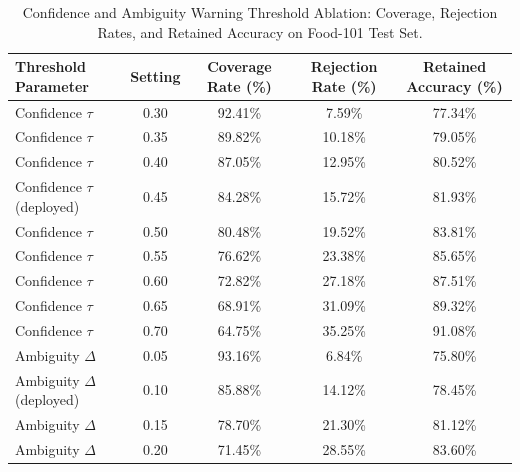 \begin{table}[htbp]
\centering
\caption{Confidence and Ambiguity Warning Threshold Ablation: Coverage, Rejection Rates, and Retained Accuracy on Food-101 Test Set.}
\label{tbl:confidence_ablation}
\small
\begin{tabular}{lcccc}
\toprule
Threshold Parameter & Setting & Coverage Rate (\%) & Rejection Rate (\%) & Retained Accuracy (\%) \\
\midrule
Confidence $\tau$ & 0.30 & 92.41\% & 7.59\% & 77.34\% \\
Confidence $\tau$ & 0.35 & 89.82\% & 10.18\% & 79.05\% \\
Confidence $\tau$ & 0.40 & 87.05\% & 12.95\% & 80.52\% \\
Confidence $\tau$ (deployed) & 0.45 & 84.28\% & 15.72\% & 81.93\% \\
Confidence $\tau$ & 0.50 & 80.48\% & 19.52\% & 83.81\% \\
Confidence $\tau$ & 0.55 & 76.62\% & 23.38\% & 85.65\% \\
Confidence $\tau$ & 0.60 & 72.82\% & 27.18\% & 87.51\% \\
Confidence $\tau$ & 0.65 & 68.91\% & 31.09\% & 89.32\% \\
Confidence $\tau$ & 0.70 & 64.75\% & 35.25\% & 91.08\% \\
\midrule
Ambiguity $\Delta$ & 0.05 & 93.16\% & 6.84\% & 75.80\% \\
Ambiguity $\Delta$ (deployed) & 0.10 & 85.88\% & 14.12\% & 78.45\% \\
Ambiguity $\Delta$ & 0.15 & 78.70\% & 21.30\% & 81.12\% \\
Ambiguity $\Delta$ & 0.20 & 71.45\% & 28.55\% & 83.60\% \\
\bottomrule
\end{tabular}
\end{table}
